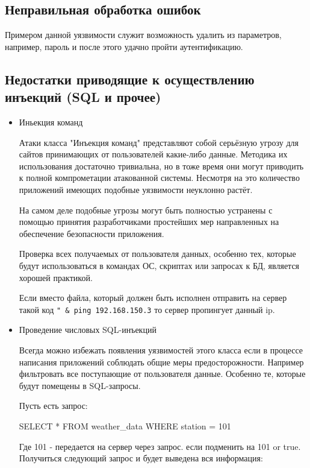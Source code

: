 \documentclass{article}
\begin{document}
\subsection{Неправильная обработка ошибок}

Примером данной уязвимости служит возможность удалить из параметров, например, пароль и после этого удачно пройти аутентификацию.


\subsection{Недостатки приводящие к осуществлению инъекций (SQL и прочее)}

\begin{itemize}
	
	\item Иньекция команд
	
	Атаки класса "Инъекция команд" представляют собой серьёзную угрозу для сайтов принимающих
	от пользователей какие-либо данные. Методика их использования достаточно тривиальна, но в тоже
	время они могут приводить к полной компрометации атакованной системы. Несмотря на это количество
	приложений имеющих подобные уязвимости неуклонно растёт.
	
	На самом деле подобные угрозы могут быть полностью устранены с помощью принятия разработчиками
	простейших мер направленных на обеспечение безопасности приложения.
	
	Проверка всех получаемых от пользователя данных, особенно тех, которые будут использоваться
	в командах ОС, скриптах или запросах к БД, является хорошей практикой.
	
	Если вместо файла, который должен быть исполнен отправить на сервер такой код \verb'" & ping 192.168.150.3' то сервер пропингует данный ip.
	
	\item Проведение числовых SQL-инъекций
	
	Всегда можно избежать появления уязвимостей этого класса
	если в процессе написания приложений соблюдать общие меры предосторожности.
	Например фильтровать все поступающие от пользователя данные. Особенно те, которые
	будут помещены в SQL-запросы. 
	
	Пусть есть запрос:
	
	SELECT * FROM weather\_data WHERE station = 101
	
	Где 101 - передается на сервер через запрос. если подменить на 101 or true. Получиться следующий запрос и будет выведена вся информация:
	

\end{itemize}
\end{document}

